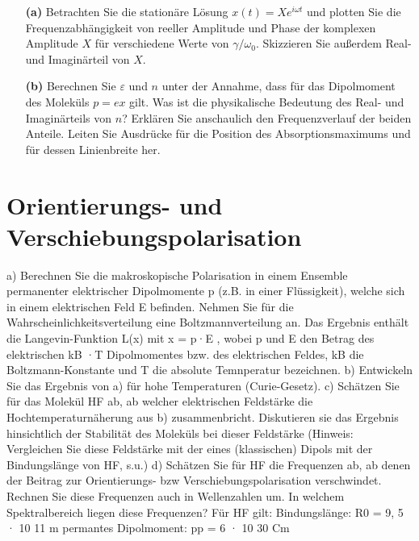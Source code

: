 \vspace*{1\baselineskip}

\begin{itemize}

	\item[\textbf{(a)}] Betrachten Sie die stationäre Lösung $x(t) = X e^{i\omega t}$ und plotten Sie die Frequenzabhängigkeit von reeller Amplitude und Phase der komplexen Amplitude $X$ für verschiedene Werte von $\gamma/\omega_0$. Skizzieren Sie außerdem Real- und Imaginärteil von $X$.
	
	\item[\textbf{(b)}] Berechnen Sie $\varepsilon$ und $n$ unter der Annahme, dass für das Dipolmoment des Moleküls $p=ex$ gilt. Was ist die physikalische Bedeutung des Real- und Imaginärteils von $n$? Erklären Sie anschaulich den Frequenzverlauf der beiden Anteile. Leiten Sie Ausdrücke für die Position des Absorptionsmaximums und für dessen Linienbreite her.
	
\end{itemize}


\section{Orientierungs- und Verschiebungspolarisation}

a) Berechnen Sie die makroskopische Polarisation in einem Ensemble permanenter elektrischer
 Dipolmomente p (z.B. in einer Flüssigkeit), welche sich in einem elektrischen Feld E befinden.
   Nehmen Sie für die Wahrscheinlichkeitsverteilung eine Boltzmannverteilung an. Das Ergebnis enthält die Langevin-Funktion L(x) mit x = p·E , wobei p und E den Betrag des elektrischen
kB ·T
Dipolmomentes bzw. des elektrischen Feldes, kB die Boltzmann-Konstante und T die absolute
Temnperatur bezeichnen.
b) Entwickeln Sie das Ergebnis von a) für hohe Temperaturen (Curie-Gesetz).
c) Schätzen Sie für das Molekül HF ab, ab welcher elektrischen Feldstärke die Hochtemperaturnäherung aus b) zusammenbricht. Diskutieren sie das Ergebnis hinsichtlich der Stabilität des Moleküls bei dieser Feldstärke (Hinweis: Vergleichen Sie diese Feldstärke mit der eines (klassischen) Dipols mit der Bindungslänge von HF, s.u.)
d) Schätzen Sie für HF die Frequenzen ab, ab denen der Beitrag zur Orientierungs- bzw Verschiebungspolarisation verschwindet. Rechnen Sie diese Frequenzen auch in Wellenzahlen um. In welchem Spektralbereich liegen diese Frequenzen?
Für HF gilt:
Bindungslänge: R0 = 9, 5 · 10 11 m
permantes Dipolmoment: pp = 6 · 10 30 Cm


